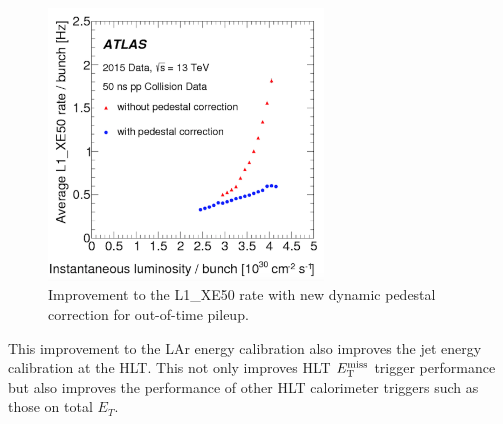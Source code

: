 \begin{figure}[htb]
  \begin{center}
    \includegraphics[width=0.65\textwidth]{figures/trigger/L1_XE50.png}\hspace{0.05\textwidth}
\end{center}
\caption{Improvement to the L1\_XE50 rate with new dynamic pedestal correction for out-of-time pileup.\cite{Trigger2015}}
\label{fig:trigScheme} 
\end{figure}

\indent This improvement to the LAr energy calibration also improves the jet energy calibration at the HLT.  This not only improves HLT $E_{\mathrm{T}}^{\mathrm{miss}}$ trigger performance but also improves the performance of other HLT calorimeter triggers such as those on total $E_T$. \cite{Trigger2016} \\